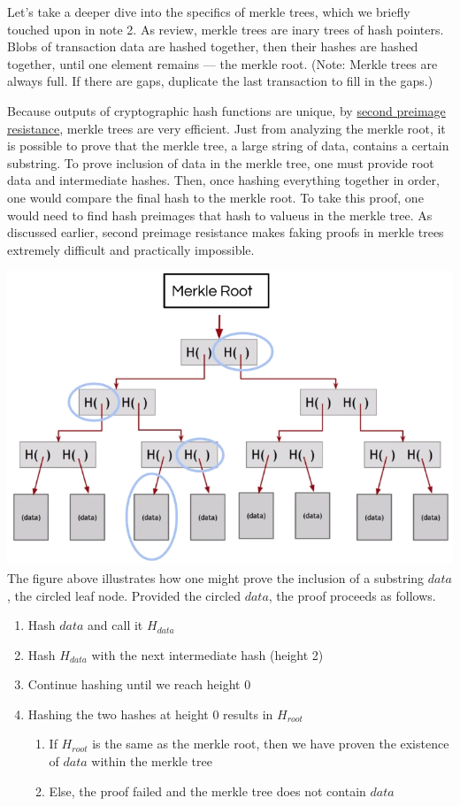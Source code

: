 \documentclass[full.tex]{subfiles}
\begin{document}
 Let's take a deeper dive into the specifics of merkle trees, which we briefly touched upon in note 2. As review, merkle trees are inary trees of hash pointers. Blobs of transaction data are hashed together, then their hashes are hashed together, until one element remains --- the merkle root. (Note: Merkle trees are always full. If there are gaps, duplicate the last transaction to fill in the gaps.)
 
 Because outputs of cryptographic hash functions are unique, by \underline{second preimage resistance}, merkle trees are very efficient. Just from analyzing the merkle root, it is possible to prove that the merkle tree, a large string of data, contains a certain substring. To prove inclusion of data in the merkle tree, one must provide root data and intermediate hashes. Then, once hashing everything together in order, one would compare the final hash to the merkle root. To take this proof, one would need to find hash preimages that hash to valueus in the merkle tree. As discussed earlier, second preimage resistance makes faking proofs in merkle trees extremely difficult and practically impossible.

 \includegraphics[scale=0.4]{merkle_proof} \\
 
 The figure above illustrates how one might prove the inclusion of a substring $data$, the circled leaf node. Provided the circled $data$, the proof proceeds as follows.
 
 \begin{enumerate}
     \item Hash $data$ and call it $H_{data}$
     \item Hash $H_{data}$ with the next intermediate hash (height 2)
     \item Continue hashing until we reach height 0
     \item Hashing the two hashes at height 0 results in $H_{root}$
     \begin{enumerate}
         \item If $H_{root}$ is the same as the merkle root, then we have proven the existence of $data$ within the merkle tree
         \item Else, the proof failed and the merkle tree does not contain $data$
     \end{enumerate}
 \end{enumerate}
 
\end{document}
